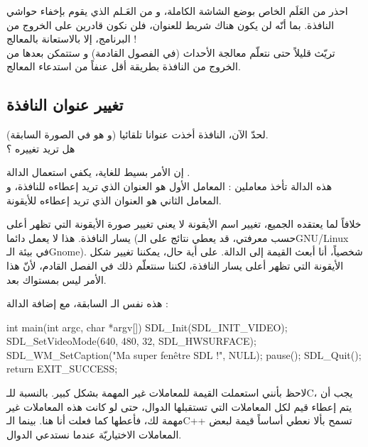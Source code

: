 \begin{warning}
احذر من العَلَم 
الخاص بوضع الشاشة الكاملة، و من العَـلم 
الذي يقوم بإخفاء حواشي النافذة. بما أنّه لن يكون هناك شريط للعنوان، فلن نكون قادرين على الخروج من البرنامج، إلا بالاستعانة بالمعالج !\\
تريّث قليلاً حتى نتعلّم معالجة الأحداث (في الفصول القادمة) و ستتمكن بعدها من الخروج من النافذة بطريقة أقل عنفاً من استدعاء المعالج.
\end{warning}

\subsection{تغيير عنوان النافذة}

لحدّ الآن، النافذة أخذت عنوانا تلقائيا (و هو 
في الصورة السابقة).\\
هل تريد تغييره ؟

إن الأمر بسيط للغاية، يكفي استعمال الدالة
.\\
هذه الدالة تأخذ معاملين : المعامل الأول هو العنوان الذي تريد إعطاءه للنافذة، و المعامل الثاني هو العنوان الذي تريد إعطاءه للأيقونة.

خلافاً لما يعتقده الجميع، تغيير اسم الأيقونة لا يعني تغيير صورة الأيقونة التي تظهر أعلى يسار النافذة. هذا لا يعمل دائما (حسب معرفتي، قد يعطي نتائج على الـ\textenglish{GNU/Linux}
في بيئة الـ\textenglish{Gnome}).
شخصياً، أنا أبعث القيمة
إلى الدالة. على أية حال، يمكننا تغيير شكل الأيقونة التي تظهر أعلى يسار النافذة، لكننا سنتعلّم ذلك في الفصل القادم، لأنّ هذا الأمر ليس بمستواك بعد.

هذه نفس الـ
السابقة، مع إضافة الدالة
 :

\begin{Csource}
int main(int argc, char *argv[])
{
	SDL_Init(SDL_INIT_VIDEO);
	SDL_SetVideoMode(640, 480, 32, SDL_HWSURFACE);
	SDL_WM_SetCaption("Ma super fenêtre SDL !", NULL);
	pause();
	SDL_Quit();
	return EXIT_SUCCESS;
}
\end{Csource}

\begin{information}
لاحظ بأنني استعملت القيمة 
للمعاملات غير المهمة بشكل كبير. بالنسبة للـ\textenglish{C}،
يجب أن يتم إعطاء قيم لكل المعاملات التي تستقبلها الدوال، حتى لو كانت هذه المعاملات غير مهمة لك، فأعطها
كما فعلت أنا هنا. بينما الـ\textenglish{C++}
تسمح بألا نعطي أساساً قيمة لبعض المعاملات الاختياريّة عندما نستدعي الدوال.
\end{information}

